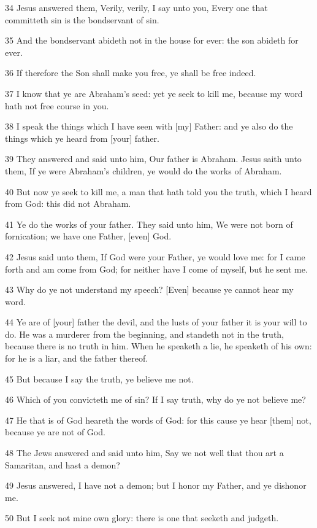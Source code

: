 \par 34 Jesus answered them, Verily, verily, I say unto you, Every one that committeth sin is the bondservant of sin.
\par 35 And the bondservant abideth not in the house for ever: the son abideth for ever.
\par 36 If therefore the Son shall make you free, ye shall be free indeed.
\par 37 I know that ye are Abraham's seed: yet ye seek to kill me, because my word hath not free course in you.
\par 38 I speak the things which I have seen with [my] Father: and ye also do the things which ye heard from [your] father.
\par 39 They answered and said unto him, Our father is Abraham. Jesus saith unto them, If ye were Abraham's children, ye would do the works of Abraham.
\par 40 But now ye seek to kill me, a man that hath told you the truth, which I heard from God: this did not Abraham.
\par 41 Ye do the works of your father. They said unto him, We were not born of fornication; we have one Father, [even] God.
\par 42 Jesus said unto them, If God were your Father, ye would love me: for I came forth and am come from God; for neither have I come of myself, but he sent me.
\par 43 Why do ye not understand my speech? [Even] because ye cannot hear my word.
\par 44 Ye are of [your] father the devil, and the lusts of your father it is your will to do. He was a murderer from the beginning, and standeth not in the truth, because there is no truth in him. When he speaketh a lie, he speaketh of his own: for he is a liar, and the father thereof.
\par 45 But because I say the truth, ye believe me not.
\par 46 Which of you convicteth me of sin? If I say truth, why do ye not believe me?
\par 47 He that is of God heareth the words of God: for this cause ye hear [them] not, because ye are not of God.
\par 48 The Jews answered and said unto him, Say we not well that thou art a Samaritan, and hast a demon?
\par 49 Jesus answered, I have not a demon; but I honor my Father, and ye dishonor me.
\par 50 But I seek not mine own glory: there is one that seeketh and judgeth.
